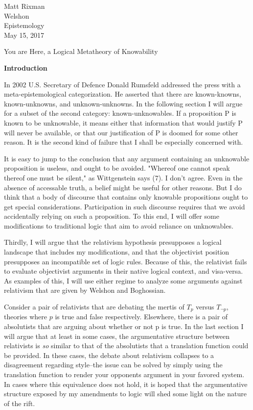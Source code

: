 \documentclass[12pt]{article}
\begin{document}
\begin{flushleft}

Matt Rixman\\
Welshon\\
Epistemology\\
May 15, 2017\\


\begin{center}
    You are Here, a Logical Metatheory of Knowability
\end{center}

\textbf{Introduction}
\setlength{\parindent}{0.5in}


In 2002 U.S. Secretary of Defence Donald Rumsfeld addressed the press with a meta-epistemological categorization.
He asserted that there are known-knowns, known-unknowns, and unknown-unknowns.
In the following section I will argue for a subset of the second category: known-unknowables.
If a proposition P is known to be unknowable, it means either that information that would justify P will never be available\footnotemark, or that our justification of P is doomed for some other reason.
It is the second kind of failure that I shall be especially concerned with.

It is easy to jump to the conclusion that any argument containing an unknowable proposition is useless, and ought to be avoided.
"Whereof one cannot speak thereof one must be silent," as Wittgenstein says (7).
I don't agree.
Even in the absence of accessable truth, a belief might be useful for other reasons.
But I do think that a body of discourse that contains only knowable propositions ought to get special considerations.
Participation in such discourse requires that we avoid accidentally relying on such a proposition.
To this end, I will offer some modifications to traditional logic that aim to avoid reliance on unknowables.

Thirdly, I will argue that the relativism hypothesis presupposes a logical landscape that includes my modifications, and that the objectivist position presupposes an incompatible set of logic rules.
Because of this, the relativist fails to evaluate objectivist arguments in their native logical context, and visa-versa.
As examples of this, I will use either regime to analyze some arguments against relativism that are given by Welshon and Boghossian.

Consider a pair of relativists that are debating the mertis of $T_p$ versus $T_{\neg p}$, theories where $p$ is true and false respectively.
Elsewhere, there is a pair of absolutists that are arguing about whether or not p is true.
In the last section I will argue that at least in some cases, the argumentative structure between relativists is \textit{so} similar to that of the absolutists that a translation function could be provided.
In these cases, the debate about relativism collapses to a disagreement regarding style--the issue can be solved by simply using the translation function to render your opponents argument in your favored system.
In cases where this equivalence does not hold, it is hoped that the argumentative structure exposed by my amendments to logic will shed some light on the nature of the rift.


\end{flushleft}
\end{document}
